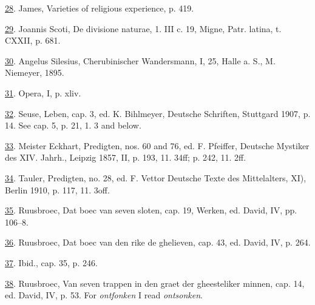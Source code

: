 \protect\hypertarget{23_NOTES.xhtmlux5cux23id_681}{\protect\hyperlink{17_Chapter_Ten__THE_FAILURE_OF_IMAG.xhtmlux5cux23id_680}{28}}.
James, Varieties of religious experience, p. 419.

\protect\hypertarget{23_NOTES.xhtmlux5cux23id_679}{\protect\hyperlink{17_Chapter_Ten__THE_FAILURE_OF_IMAG.xhtmlux5cux23id_678}{29}}.
Joannis Scoti, De divisione naturae, 1. III c. 19, Migne, Patr. latina,
t. CXXII, p. 681.

\protect\hypertarget{23_NOTES.xhtmlux5cux23id_677}{\protect\hyperlink{17_Chapter_Ten__THE_FAILURE_OF_IMAG.xhtmlux5cux23id_676}{30}}.
Angelus Silesius, Cherubinischer Wandersmann, I, 25, Halle a. S., M.
Niemeyer, 1895.

\protect\hypertarget{23_NOTES.xhtmlux5cux23id_675}{\protect\hyperlink{17_Chapter_Ten__THE_FAILURE_OF_IMAG.xhtmlux5cux23id_674}{31}}.
Opera, I, p. xliv.

\protect\hypertarget{23_NOTES.xhtmlux5cux23id_673}{\protect\hyperlink{17_Chapter_Ten__THE_FAILURE_OF_IMAG.xhtmlux5cux23id_672}{32}}.
Seuse, Leben, cap. 3, ed. K. Bihlmeyer, Deutsche Schriften, Stuttgard
1907, p. 14. See cap. 5, p. 21, 1. 3 and below.

\protect\hypertarget{23_NOTES.xhtmlux5cux23id_671}{\protect\hyperlink{17_Chapter_Ten__THE_FAILURE_OF_IMAG.xhtmlux5cux23id_670}{33}}.
Meister Eckhart, Predigten, nos. 60 and 76, ed. F. Pfeiffer, Deutsche
Mystiker des XIV. Jahrh., Leipzig 1857, II, p. 193, 11. 34ff; p. 242,
11. 2ff.

\protect\hypertarget{23_NOTES.xhtmlux5cux23page_428}{\protect\hyperlink{17_Chapter_Ten__THE_FAILURE_OF_IMAG.xhtmlux5cux23id_669}{34}}.
Tauler, Predigten, no. 28, ed. F. Vettor Deutsche Texte des
Mittelalters, XI), Berlin 1910, p. 117, 11. 3off.

\protect\hypertarget{23_NOTES.xhtmlux5cux23id_668}{\protect\hyperlink{17_Chapter_Ten__THE_FAILURE_OF_IMAG.xhtmlux5cux23id_667}{35}}.
Ruusbroec, Dat boec van seven sloten, cap. 19, Werken, ed. David, IV,
pp. 106--8.

\protect\hypertarget{23_NOTES.xhtmlux5cux23id_666}{\protect\hyperlink{17_Chapter_Ten__THE_FAILURE_OF_IMAG.xhtmlux5cux23id_665}{36}}.
Ruusbroec, Dat boec van den rike de ghelieven, cap. 43, ed. David, IV,
p. 264.

\protect\hypertarget{23_NOTES.xhtmlux5cux23id_664}{\protect\hyperlink{17_Chapter_Ten__THE_FAILURE_OF_IMAG.xhtmlux5cux23id_663}{37}}.
Ibid., cap. 35, p. 246.

\protect\hypertarget{23_NOTES.xhtmlux5cux23id_662}{\protect\hyperlink{17_Chapter_Ten__THE_FAILURE_OF_IMAG.xhtmlux5cux23id_661}{38}}.
Ruusbroec, Van seven trappen in den graet der gheesteliker minnen, cap.
14, ed. David, IV, p. 53. For \emph{ontfonken} I read \emph{ontsonken}.

